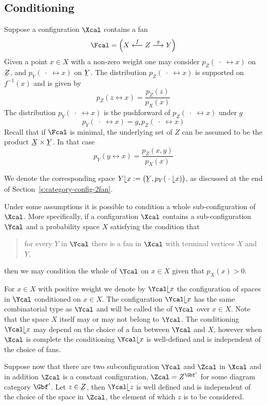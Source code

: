 \subsection{Conditioning}\label{s:config-conditioning}
  Suppose a configuration $\Xcal$ contains a fan 
  \[
  \Fcal = \left(X \oot[f] Z \too[g] Y\right)
  \] 
  Given a point $x\in X$ with a non-zero weight one may consider
   $p_Z(\;\cdot\;\rel x)$
  on $\un Z$, and $p_Y( \; \cdot \;\rel x)$ on $\un Y$.  The
  distribution $p_Z(\; \cdot \; \rel x)$ is supported on $f^{-1}(x)$
  and is given by
  \[
  p_Z( z \rel x) 
  = 
  \frac{p_Z(z)}{p_X(x)}
  \]
  The distribution $p_Y(\;\cdot\;\rel x)$ is the pushforward of $p_Z(
  \; \cdot \; \rel x)$ under $g$
  \[
   p_Y(\; \cdot \; \rel x) 
   = 
   g_* p_Z(\; \cdot\;\rel x)
  \]
  Recall that if $\Fcal$ is minimal, the underlying set of $Z$ can be
  assumed to be the product $\un X \times \un Y$. In that case
  \[
  p_Y( y \rel x ) = \frac{p_Z(x,y)}{p_X(x)}
  \]
  
  We denote the corresponding space $Y\rel x:=\big(\un
  Y,p_Y(\;\cdot\;\rel x)\big)$, as discussed at the end of
  Section~\ref{s:category-config-2fan}.

  Under some assumptions it is possible to condition a whole
  sub-configuration of $\Xcal$.  More specifically, if a configuration
  $\Xcal$ contains a sub-configuration $\Ycal$ and a probability space
  $X$ satisfying the condition that
  \begin{quote} 
    for every $Y$ in $\Ycal$ there is a fan in $\Xcal$ with terminal
    vertices $X$ and $Y$,
  \end{quote}
  then we may condition the whole of $\Ycal$ on $x \in X$ given that
  $p_X(x)>0$.
  
  For $x\in X$ with positive weight we denote by $\Ycal\rel x$ the
  configuration of spaces in $\Ycal$ conditioned on $x\in X$. The
  configuration $\Ycal\rel x$ has the same combinatorial type as
  $\Ycal$ and will be called the  of $\Ycal$ over
  $x\in X$.  Note that the space $X$ itself may or may not belong to
  $\Ycal$. The conditioning $\Ycal\rel x$ may depend on the choice of
  a fan between $\Ycal$ and $X$, however when $\Xcal$ is complete the
  conditioning $\Ycal\rel x$ is well-defined and is independent of the
  choice of fans.
  
  Suppose now that there are two subconfiguration $\Ycal$ and
  $\Zcal$ in $\Xcal$ and in addition $\Zcal$ is a constant
  configuration, $\Zcal=Z^{\Gbf'}$ for some diagram category
  $\Gbf'$. Let $z\in\un Z$, then $\Ycal\rel z$ is well defined and is
  independent of the choice of the space in $\Zcal$, the element of
  which $z$ is to be considered.

